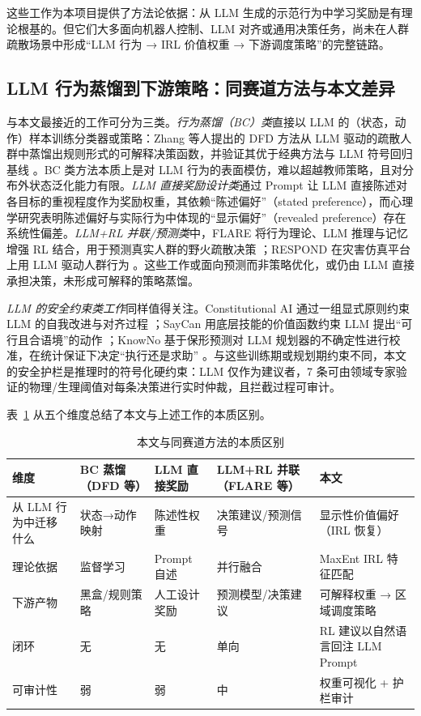 \documentclass[UTF8,zihao=-4]{ctexart}
\begin{document}
这些工作为本项目提供了方法论依据：从 LLM 生成的示范行为中学习奖励是有理论根基的。但它们大多面向机器人控制、LLM 对齐或通用决策任务，尚未在人群疏散场景中形成“LLM 行为 → IRL 价值权重 → 下游调度策略”的完整链路。

\subsection{LLM 行为蒸馏到下游策略：同赛道方法与本文差异}

与本文最接近的工作可分为三类。\emph{行为蒸馏（BC）类}直接以 LLM 的（状态，动作）样本训练分类器或策略：Zhang 等人提出的 DFD 方法从 LLM 驱动的疏散人群中蒸馏出规则形式的可解释决策函数，并验证其优于经典方法与 LLM 符号回归基线 \cite{zhang2026star}。BC 类方法本质上是对 LLM 行为的表面模仿，难以超越教师策略，且对分布外状态泛化能力有限。\emph{LLM 直接奖励设计类}通过 Prompt 让 LLM 直接陈述对各目标的重视程度作为奖励权重，其依赖“陈述偏好”（stated preference），而心理学研究表明陈述偏好与实际行为中体现的“显示偏好”（revealed preference）存在系统性偏差。\emph{LLM+RL 并联/预测类}中，FLARE 将行为理论、LLM 推理与记忆增强 RL 结合，用于预测真实人群的野火疏散决策 \cite{chen2025flare}；RESPOND 在灾害仿真平台上用 LLM 驱动人群行为 \cite{sultimov2026respond}。这些工作或面向预测而非策略优化，或仍由 LLM 直接承担决策，未形成可解释的策略蒸馏。

\emph{LLM 的安全约束类工作}同样值得关注。Constitutional AI 通过一组显式原则约束 LLM 的自我改进与对齐过程 \cite{bai2022constitutional}；SayCan 用底层技能的价值函数约束 LLM 提出“可行且合语境”的动作 \cite{ahn2022saycan}；KnowNo 基于保形预测对 LLM 规划器的不确定性进行校准，在统计保证下决定“执行还是求助” \cite{ren2023knowno}。与这些训练期或规划期约束不同，本文的安全护栏是推理时的符号化硬约束：LLM 仅作为建议者，7 条可由领域专家验证的物理/生理阈值对每条决策进行实时仲裁，且拦截过程可审计。

表~\ref{tab:related_work_comparison} 从五个维度总结了本文与上述工作的本质区别。

\begin{table}[t]
  \centering
  \small
  \caption{本文与同赛道方法的本质区别}
  \label{tab:related_work_comparison}
  \begin{tabularx}{\textwidth}{@{}p{2.4cm}XXXX@{}}
    \toprule
    维度 & BC 蒸馏（DFD 等） & LLM 直接奖励 & LLM+RL 并联（FLARE 等） & 本文 \\
    \midrule
    从 LLM 行为中迁移什么 & 状态→动作映射 & 陈述性权重 & 决策建议/预测信号 & 显示性价值偏好（IRL 恢复） \\
    理论依据 & 监督学习 & Prompt 自述 & 并行融合 & MaxEnt IRL 特征匹配 \\
    下游产物 & 黑盒/规则策略 & 人工设计奖励 & 预测模型/决策建议 & 可解释权重 → 区域调度策略 \\
    闭环 & 无 & 无 & 单向 & RL 建议以自然语言回注 LLM Prompt \\
    可审计性 & 弱 & 弱 & 中 & 权重可视化 + 护栏审计 \\
    \bottomrule
  \end{tabularx}
\end{table}
\end{document}
